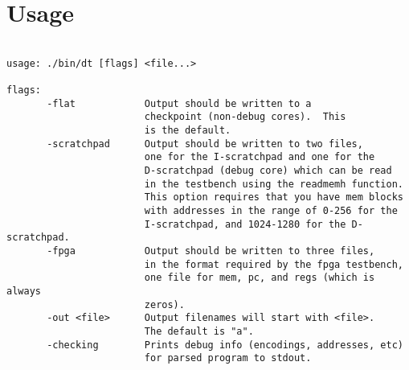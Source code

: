\section{Usage\label{sec:usage}}

\begin{verbatim}

usage: ./bin/dt [flags] <file...>

flags:
       -flat            Output should be written to a
                        checkpoint (non-debug cores).  This
                        is the default.
       -scratchpad      Output should be written to two files,
                        one for the I-scratchpad and one for the
                        D-scratchpad (debug core) which can be read
                        in the testbench using the readmemh function.
                        This option requires that you have mem blocks
                        with addresses in the range of 0-256 for the
                        I-scratchpad, and 1024-1280 for the D-scratchpad.
       -fpga            Output should be written to three files,
                        in the format required by the fpga testbench,
                        one file for mem, pc, and regs (which is always
                        zeros).
       -out <file>      Output filenames will start with <file>.
                        The default is "a".
       -checking        Prints debug info (encodings, addresses, etc)
                        for parsed program to stdout.

\end{verbatim}

